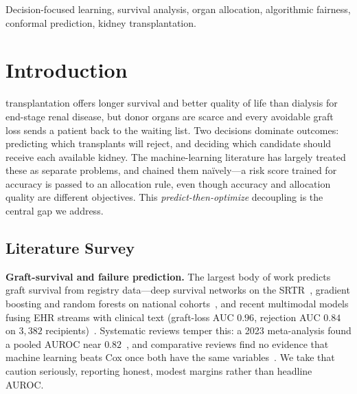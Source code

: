 \documentclass[journal]{IEEEtran}
\begin{document}
\begin{IEEEkeywords}
Decision-focused learning, survival analysis, organ allocation, algorithmic fairness, conformal prediction, kidney transplantation.
\end{IEEEkeywords}

\IEEEpeerreviewmaketitle

\begin{center}
\end{center}
\vspace{4pt}

\section{Introduction}
 transplantation offers longer survival and better quality of life than dialysis for end-stage renal disease, but donor organs are scarce and every avoidable graft loss sends a patient back to the waiting list. Two decisions dominate outcomes: predicting which transplants will reject, and deciding which candidate should receive each available kidney. The machine-learning literature has largely treated these as separate problems, and chained them na\"ively---a risk score trained for accuracy is passed to an allocation rule, even though accuracy and allocation quality are different objectives. This \emph{predict-then-optimize} decoupling is the central gap we address.

\subsection{Literature Survey}
\textbf{Graft-survival and failure prediction.} The largest body of work predicts graft survival from registry data---deep survival networks on the SRTR~\cite{luck}, gradient boosting and random forests on national cohorts~\cite{bae,thong}, and recent multimodal models fusing EHR streams with clinical text (graft-loss AUC $0.96$, rejection AUC $0.84$ on $3{,}382$ recipients)~\cite{tfn}. Systematic reviews temper this: a 2023 meta-analysis found a pooled AUROC near $0.82$~\cite{meta23}, and comparative reviews find no evidence that machine learning beats Cox once both have the same variables~\cite{klundert,bae,dibello}. We take that caution seriously, reporting honest, modest margins rather than headline AUROC.
\end{document}

